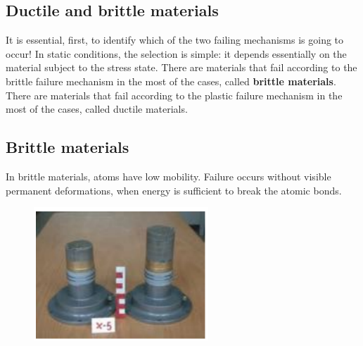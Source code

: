 \documentclass[class=report, crop=false, 12pt,a4paper]{standalone}
\begin{document}
\subsection{Ductile and brittle materials}
It is essential, first, to identify which of the two failing mechanisms is going to occur! In static conditions, the selection is simple: it depends essentially on the material subject to the stress state. There are materials that fail according to the brittle failure mechanism in the most of the cases, called \textbf{brittle materials}. There are materials that fail according to the plastic failure mechanism in the most of the cases, called ductile materials. 
\subsection{Brittle materials}
In brittle materials, atoms have low mobility. Failure occurs without visible permanent deformations, when energy is sufficient to break the atomic bonds.
\begin{figure}[H]
  \centering
  \includegraphics[height = 5cm]{../img/diagram72.png}
  \caption{}
\end{figure}
\end{document}
